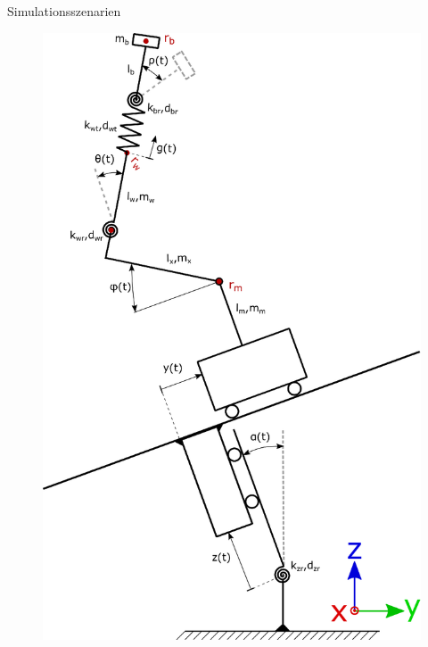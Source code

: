 \documentclass[10pt,xcolor=dvipsnames]{beamer}
\begin{document}
\begin{frame}{Simulationsszenarien}
\begin{minipage}{0.38\textwidth}
\begin{figure}
				\includegraphics[width=1.1\linewidth]{./pics/SchematischesModell.eps}
			\end{figure}
		\end{minipage}		
	\end{frame}
\end{document}
